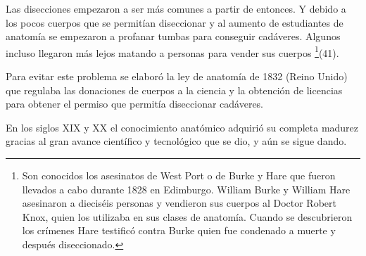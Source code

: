 Las disecciones empezaron a ser más comunes a partir de entonces. Y debido a los pocos cuerpos que se permitían diseccionar y al aumento de estudiantes de anatomía se empezaron a profanar tumbas para conseguir cadáveres. Algunos incluso llegaron más lejos matando a personas para vender sus cuerpos \footnote{Son conocidos los asesinatos de West Port o de Burke y Hare que fueron llevados a cabo durante 1828 en Edimburgo. William Burke y William Hare asesinaron a dieciséis personas y vendieron sus cuerpos al Doctor Robert Knox, quien los utilizaba en sus clases de anatomía. Cuando se descubrieron los crímenes Hare testificó contra Burke quien fue condenado a muerte y después diseccionado.}(41).

Para evitar este problema se elaboró la ley de anatomía de 1832 (Reino Unido) que regulaba las donaciones de cuerpos a la ciencia y la obtención de licencias para obtener el permiso que permitía diseccionar cadáveres.

En los siglos XIX y XX el conocimiento anatómico adquirió su completa madurez gracias al gran avance científico y tecnológico que se dio, y aún se sigue dando.





